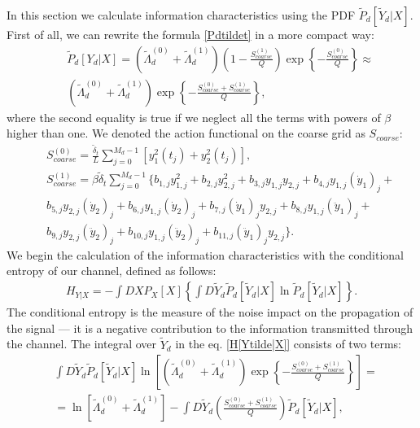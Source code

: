 \documentclass{article}
\begin{document}
In this section we calculate information characteristics using the PDF $\tilde{P}_{d}[\tilde{Y}_{d}|X]$. First of all, we can rewrite the formula \eqref{Pdtildet} in a more compact way:
\begin{eqnarray}
    &&\tilde{P}_{d}[Y_{d}|X] = \left(\tilde{\Lambda}_{d}^{(0)}+\tilde{\Lambda}_{d}^{(1)}\right)\left(1-\frac{S_{coarse}^{(1)}}{Q}\right)\exp\left\{-\frac{S_{coarse}^{(0)}}{Q}\right\}\approx\nonumber \\
    &&\left(\tilde{\Lambda}_{d}^{(0)}+\tilde{\Lambda}_{d}^{(1)}\right)\exp\left\{-\frac{S_{coarse}^{(0)}+S_{coarse}^{(1)}}{Q}\right\},
\end{eqnarray}
where the second equality is true if we neglect all the terms with powers of $\beta$ higher than one. We denoted the action functional on the coarse grid as $S_{coarse}$:
\begin{eqnarray}
    &&S_{coarse}^{(0)} = \frac{\tilde{\delta}_{t}}{L}\sum_{j=0}^{M_{d}-1} \left[y_{1}^{2}(t_{j}) + y_{2}^{2}(t_{j})\right],\\
    &&S_{coarse}^{(1)} = \beta\tilde{\delta}_{t} \sum_{j=0}^{M_{d}-1} \big\{b_{1,j}y_{1,j}^{2} + b_{2,j}y_{2,j}^{2} + b_{3,j}y_{1,j}y_{2,j} + b_{4,j}y_{1,j}(\dot{y}_{1})_{j}  + \nonumber\\
    && b_{5,j}y_{2,j}(\dot{y}_{2})_{j} +b_{6,j}y_{1,j}(\dot{y}_{2})_{j} + b_{7,j}(\dot{y}_{1})_{j}y_{2,j} + b_{8,j}y_{1,j}(\ddot{y}_{1})_{j}+ \nonumber\\
    && b_{9,j}y_{2,j}(\ddot{y}_{2})_{j} + b_{10,j}y_{1,j}(\ddot{y}_{2})_{j} + b_{11,j}(\ddot{y}_{1})_{j}y_{2,j}\big\}.
\end{eqnarray}
We begin the calculation of the information characteristics with the conditional entropy of our channel, defined as follows:
\begin{eqnarray}\label{H[Ytilde|X]}
H_{Y|X} = - \int DX P_{X}[X] \left\{\int D\tilde{Y}_{d} \tilde{P}_{d}[\tilde{Y}_{d}|X] \ln \tilde{P}_{d}[\tilde{Y}_{d}|X] \right\}.
\end{eqnarray}
The conditional entropy is the measure of the noise impact on the propagation of the signal --- it is a negative contribution to the information transmitted through the channel.
The integral over $\tilde{Y}_{d}$ in the eq. \eqref{H[Ytilde|X]} consists of two terms:
\begin{eqnarray}\label{curbrackets}
 &\int D\tilde{Y}_{d} \tilde{P}_{d}[\tilde{Y}_{d}|X] \ln \left[  \left(\tilde{\Lambda}_{d}^{(0)} + \tilde{\Lambda}_{d}^{(1)}\right) \exp \left\{- \frac{S_{coarse}^{(0)} + S_{coarse}^{(1)}}{Q} \right\} \right] = \nonumber\\
 & = \ln [\tilde{\Lambda}_{d}^{(0)} + \tilde{\Lambda}_{d}^{(1)}] - \int D\tilde{Y}_{d} \left( \frac{S_{coarse}^{(0)} + S_{coarse}^{(1)}}{Q}\right) \tilde{P}_{d}[\tilde{Y}_{d}|X],
\end{eqnarray}
\end{document}
